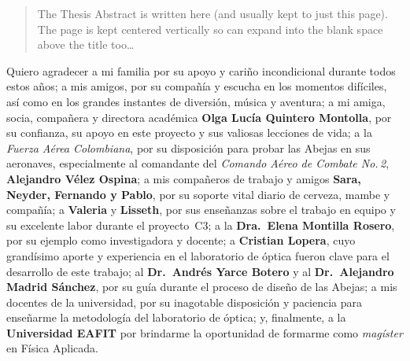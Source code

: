 \documentclass[
12pt, %
english, %
singlespacing, %
headsepline, %
]{MastersDoctoralThesis} %
\begin{document}


\begin{abstract}
\addchaptertocentry{\abstractname} %
The Thesis Abstract is written here (and usually kept to just this page). The page is kept centered vertically so can expand into the blank space above the title too\ldots
\end{abstract}


\begin{acknowledgements}
\addchaptertocentry{\acknowledgementname} %
\noindent
Quiero agradecer a mi familia por su apoyo y cariño incondicional durante todos estos años;  
a mis amigos, por su compañía y escucha en los momentos difíciles, así como en los grandes instantes de diversión, música y aventura;  
a mi amiga, socia, compañera y directora académica \textbf{Olga Lucía Quintero Montolla}, por su confianza, su apoyo en este proyecto y sus valiosas lecciones de vida;  
a la \textit{Fuerza Aérea Colombiana}, por su disposición para probar las Abejas en sus aeronaves, especialmente al comandante del \textit{Comando Aéreo de Combate No.\,2}, \textbf{Alejandro Vélez Ospina};  
a mis compañeros de trabajo y amigos \textbf{Sara, Neyder, Fernando y Pablo}, por su soporte vital diario de cerveza, mambe y compañía;  
a \textbf{Valeria} y \textbf{Lisseth}, por sus enseñanzas sobre el trabajo en equipo y su excelente labor durante el proyecto~C3;  
a la \textbf{Dra.\ Elena Montilla Rosero}, por su ejemplo como investigadora y docente;  
a \textbf{Cristian Lopera}, cuyo grandísimo aporte y experiencia en el laboratorio de óptica fueron clave para el desarrollo de este trabajo;  
al \textbf{Dr.\ Andrés Yarce Botero} y al \textbf{Dr.\ Alejandro Madrid Sánchez}, por su guía durante el proceso de diseño de las Abejas;  
a mis docentes de la universidad, por su inagotable disposición y paciencia para enseñarme la metodología del laboratorio de óptica;  
y, finalmente, a la \textbf{Universidad EAFIT} por brindarme la oportunidad de formarme como \textit{magíster} en Física Aplicada.

\end{acknowledgements}
\end{document}
